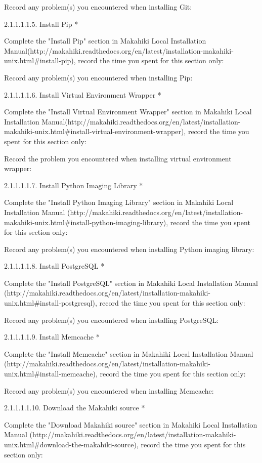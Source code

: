 Record any problem(s) you encountered when installing Git:

2.1.1.1.1.5. Install Pip *

Complete the "Install Pip" section in Makahiki Local Installation Manual(http://makahiki.readthedocs.org/en/latest/installation-makahiki-unix.html\#install-pip), record the time you spent for this section only:

Record any problem(s) you encountered when installing Pip:

2.1.1.1.1.6. Install Virtual Environment Wrapper *

Complete the "Install Virtual Environment Wrapper" section in Makahiki Local Installation Manual(http://makahiki.readthedocs.org/en/latest/installation-makahiki-unix.html\#install-virtual-environment-wrapper), record the time you spent for this section only:

Record the problem you encountered when installing virtual environment wrapper:

2.1.1.1.1.7. Install Python Imaging Library *

Complete the "Install Python Imaging Library" section in Makahiki Local Installation Manual (http://makahiki.readthedocs.org/en/latest/installation-makahiki-unix.html\#install-python-imaging-library), record the time you spent for this section only:

Record any problem(s) you encountered when installing Python imaging library:

2.1.1.1.1.8. Install PostgreSQL *

Complete the "Install PostgreSQL" section in Makahiki Local Installation Manual (http://makahiki.readthedocs.org/en/latest/installation-makahiki-unix.html\#install-postgresql), record the time you spent for this section only:

Record any problem(s) you encountered when installing PostgreSQL:

2.1.1.1.1.9. Install Memcache *

Complete the "Install Memcache" section in Makahiki Local Installation Manual (http://makahiki.readthedocs.org/en/latest/installation-makahiki-unix.html\#install-memcache), record the time you spent for this section only:

Record any problem(s) you encountered when installing Memcache:

2.1.1.1.1.10. Download the Makahiki source *

Complete the "Download Makahiki source" section in Makahiki Local Installation Manual (http://makahiki.readthedocs.org/en/latest/installation-makahiki-unix.html\#download-the-makahiki-source), record the time you spent for this section only:

